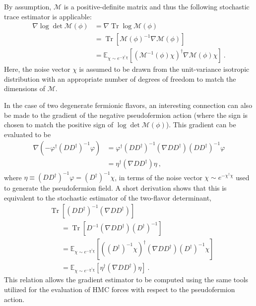\documentclass[aps,prd,twocolumn,nofootinbib,superscriptaddress,preprintnumbers]{revtex4-1}
\DeclareMathOperator{\Tr}{Tr}
\begin{document}
By assumption, $\mathcal{M}$ is a positive-definite matrix and thus the following stochastic trace estimator is applicable:
%
\begin{equation}\label{eq:grad-logdet-M-est}
\begin{aligned}
    \nabla \log \det \mathcal{M}(\phi) &= \nabla \Tr \log \mathcal{M}(\phi) \\
    &= \Tr\left[ \mathcal{M}(\phi)^{-1} \nabla \mathcal{M}(\phi)\right] \\
    &=\mathbb{E}_{\chi \sim e^{-\chi^\dag \chi}}[(\mathcal{M}^{-1}(\phi) \chi)^\dagger \nabla \mathcal{M}(\phi) \chi]\ .
\end{aligned}
\end{equation}
%
Here, the noise vector $\chi$ is assumed to be drawn from the unit-variance isotropic distribution with an appropriate number of degrees of freedom to match the dimensions of $\mathcal{M}$.

In the case of two degenerate fermionic flavors, an interesting connection can also be made to the gradient of the negative pseudofermion action (where the sign is chosen to match the positive sign of $\log \det \mathcal{M}(\phi)$). This gradient can be evaluated to be
%
\begin{equation}
\begin{aligned}
    \nabla (-\varphi^\dag (D D^\dag)^{-1} \varphi) &=
    \varphi^\dag (D D^\dag)^{-1} (\nabla D D^\dag) (D D^\dag)^{-1} \varphi \\
    &= \eta^{\dagger} (\nabla D D^\dag) \eta\ ,
\end{aligned}
\end{equation}
%
where $\eta \equiv (D D^\dag)^{-1} \varphi = (D^\dag)^{-1} \chi$, in terms of the noise vector $\chi \sim e^{-\chi^\dag \chi}$ used to generate the pseudofermion field. A short derivation shows that this is equivalent to the stochastic estimator of the two-flavor determinant,
%
\begin{equation}
\begin{aligned}
    &\Tr \left[ (D D^\dag)^{-1} (\nabla D D^\dag) \right] \\
    &\hspace{20pt}=
    \Tr \left[ D^{-1} (\nabla D D^\dag) (D^\dag)^{-1} \right] \\
    &\hspace{20pt}= \mathbb{E}_{\chi \sim e^{-\chi^\dag \chi}} [ ((D^\dag)^{-1} \chi)^\dag (\nabla D D^\dag) (D^\dag)^{-1} \chi] \\
    &\hspace{20pt}= \mathbb{E}_{\chi \sim e^{-\chi^\dag \chi}} [ \eta^\dag (\nabla D D^\dag) \eta]\ .
\end{aligned}
\end{equation}
%
This relation allows the gradient estimator to be computed using the same tools utilized for the evaluation of HMC forces with respect to the pseudofermion action.
\end{document}
